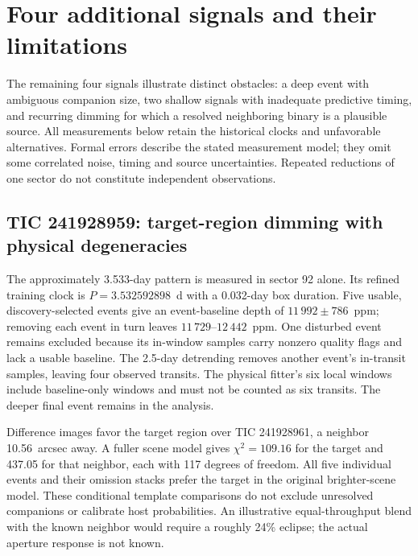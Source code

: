 \section{Four additional signals and their limitations}
\label{sec:other}

The remaining four signals illustrate distinct obstacles: a deep event with
ambiguous companion size, two shallow signals with inadequate predictive timing,
and recurring dimming for which a resolved neighboring binary is a plausible
source. All measurements below retain the historical clocks and unfavorable
alternatives. Formal errors describe the stated measurement model; they omit
some correlated noise, timing and source uncertainties. Repeated reductions of
one sector do not constitute independent observations.

\subsection{TIC 241928959: target-region dimming with physical degeneracies}
\label{sec:tic241}

The approximately 3.533-day pattern is measured in sector 92 alone. Its refined
training clock is $P=3.532592898$~d with a 0.032-day box duration. Five usable,
discovery-selected events give an event-baseline depth of $11\,992\pm786$~ppm;
removing each event in turn leaves $11\,729$--$12\,442$~ppm. One disturbed event
remains excluded because its in-window samples carry nonzero quality flags and
lack a usable baseline. The 2.5-day detrending removes another event's
in-transit samples, leaving four observed transits. The physical fitter's six
local windows include baseline-only windows and must not be counted as six
transits. The deeper final event remains in the analysis.

Difference images favor the target region over TIC 241928961, a neighbor
10.56~arcsec away. A fuller scene model gives $\chi^2=109.16$ for the target
and 437.05 for that neighbor, each with 117 degrees of freedom. All five
individual events and their omission stacks prefer the target in the original
brighter-scene model. These conditional template comparisons do not exclude
unresolved companions or calibrate host probabilities. An illustrative
equal-throughput blend with the known neighbor would require a roughly
24\% eclipse; the actual aperture response is not known.

